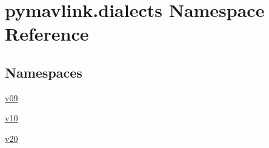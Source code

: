 \hypertarget{namespacepymavlink_1_1dialects}{}\section{pymavlink.\+dialects Namespace Reference}
\label{namespacepymavlink_1_1dialects}
\subsection*{Namespaces}
\begin{DoxyCompactItemize}
\item 
 \mbox{\hyperlink{namespacepymavlink_1_1dialects_1_1v09}{v09}}
\item 
 \mbox{\hyperlink{namespacepymavlink_1_1dialects_1_1v10}{v10}}
\item 
 \mbox{\hyperlink{namespacepymavlink_1_1dialects_1_1v20}{v20}}
\end{DoxyCompactItemize}

